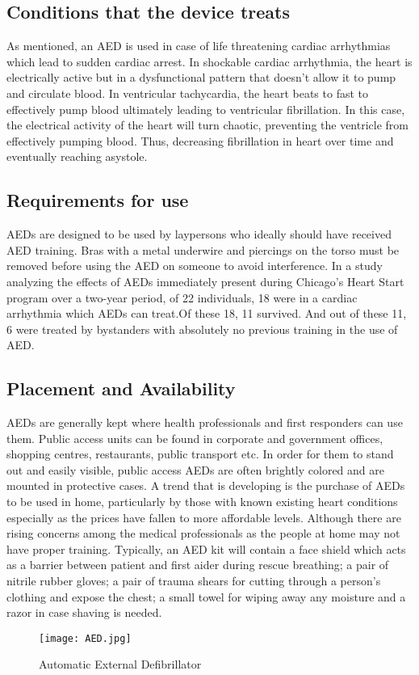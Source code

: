 \documentclass[12pt]{article}
\begin{document}
\begin{normalsize}
\subsection{Conditions that the device treats}
As mentioned, an AED is used in case of life threatening cardiac arrhythmias which lead to sudden cardiac arrest. In shockable cardiac arrhythmia, the heart is electrically active but in a dysfunctional pattern that doesn't allow it to pump and circulate blood. In ventricular tachycardia, the heart beats to fast to effectively pump blood ultimately leading to ventricular fibrillation. In this case, the electrical activity of the heart will turn chaotic, preventing the ventricle from effectively pumping blood. Thus, decreasing fibrillation in heart over time and eventually reaching asystole.

\subsection{Requirements for use}
AEDs are designed to be used by laypersons who ideally should have received AED training. Bras with a metal underwire and piercings on the torso must be removed before using the AED on someone to avoid interference. In a study analyzing the effects of AEDs immediately present during Chicago's Heart Start program over a two-year period, of 22 individuals, 18 were in a cardiac arrhythmia which AEDs can treat.Of these 18, 11 survived. And out of these 11, 6 were treated by bystanders with absolutely no previous training in the use of AED.

\subsection{Placement and Availability}
AEDs are generally kept where health professionals and first responders can use them. Public access units can be found in corporate and government offices, shopping centres, restaurants, public transport etc. In order for them to stand out and easily visible, public access AEDs are often brightly colored and are mounted in protective cases. A trend that is developing is the purchase of AEDs to be used in home, particularly by those with known existing heart conditions especially as the prices have fallen to more affordable levels. Although there are rising concerns among the medical professionals as the people at home may not have proper training.
\linebreak
\linebreak
Typically, an AED kit will contain a face shield which acts as a barrier between patient and first aider during rescue breathing; a pair of nitrile rubber gloves; a pair of trauma shears for cutting through a person's clothing and expose the chest; a small towel for wiping away any moisture and a razor in case shaving is needed.
\begin{figure}[h]
\centering
\texttt{[image: AED.jpg]}
\caption{Automatic External Defibrillator}
\end{figure}


\end{normalsize}
\end{document}
